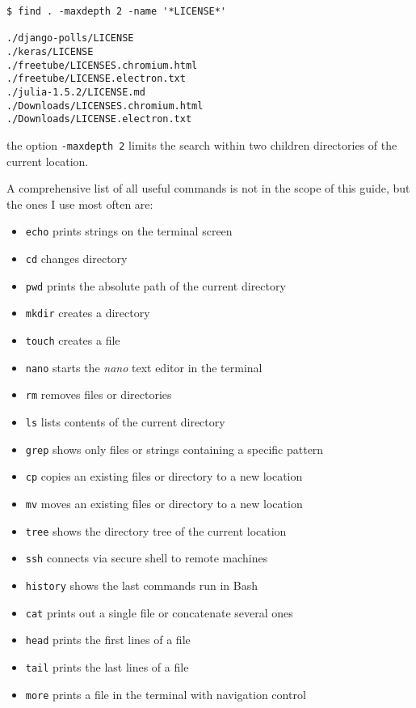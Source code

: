 \documentclass{book}
\begin{document}
\begin{lstlisting}
$ find . -maxdepth 2 -name '*LICENSE*'

./django-polls/LICENSE
./keras/LICENSE
./freetube/LICENSES.chromium.html
./freetube/LICENSE.electron.txt
./julia-1.5.2/LICENSE.md
./Downloads/LICENSES.chromium.html
./Downloads/LICENSE.electron.txt
\end{lstlisting}

the option \texttt{-maxdepth 2} limits the search within two children directories of the current location.

A comprehensive list of all useful commands is not in the scope of this guide, but the ones I use most often are:

\begin{itemize}
   \item[] \texttt{echo} prints strings on the terminal screen
   \item[] \texttt{cd} changes directory
   \item[] \texttt{pwd} prints the absolute path of the current directory
   \item[] \texttt{mkdir} creates a directory
   \item[] \texttt{touch} creates a file
   \item[] \texttt{nano} starts the \textit{nano} text editor in the terminal 
   \item[] \texttt{rm} removes files or directories
   \item[] \texttt{ls} lists contents of the current directory
   \item[] \texttt{grep} shows only files or strings containing a specific pattern
   \item[] \texttt{cp} copies an existing files or directory to a new location
   \item[] \texttt{mv} moves an existing files or directory to a new location
   \item[] \texttt{tree} shows the directory tree of the current location
   \item[] \texttt{ssh} connects via secure shell to remote machines
   \item[] \texttt{history} shows the last commands run in Bash
   \item[] \texttt{cat} prints out a single file or concatenate several ones
   \item[] \texttt{head} prints the first lines of a file
   \item[] \texttt{tail} prints the last lines of a file
   \item[] \texttt{more} prints a file in the terminal with navigation control

\end{itemize}
\end{document}
